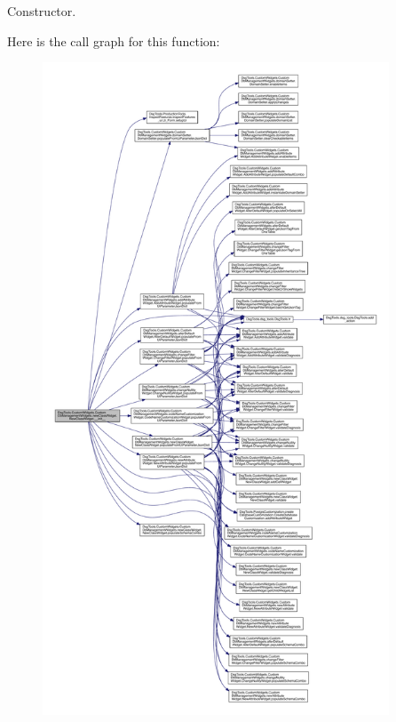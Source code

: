 \begin{DoxyVerb}Constructor.\end{DoxyVerb}
 Here is the call graph for this function\+:
\nopagebreak
\begin{figure}[H]
\begin{center}
\leavevmode
\includegraphics[height=550pt]{class_dsg_tools_1_1_custom_widgets_1_1_custom_db_management_widgets_1_1new_class_widget_1_1_new_class_widget_a6eb0a12adc995be33bfc52fe5b6d5cae_cgraph}
\end{center}
\end{figure}


